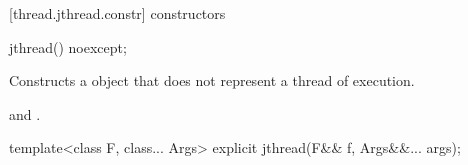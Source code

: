 \begin{codeblock}
}
\end{codeblock}


[thread.jthread.constr]{ constructors}

%
\begin{itemdecl}
jthread() noexcept;
\end{itemdecl}
\begin{itemdescr}
  \pnum\effects Constructs a  object that does not represent a thread of execution.

  \pnum\postconditions {}
        {\color{insertnote} and }.
\end{itemdescr}

%
\begin{itemdecl}
template<class F, class... Args> explicit jthread(F&& f, Args&&... args);
\end{itemdecl}

